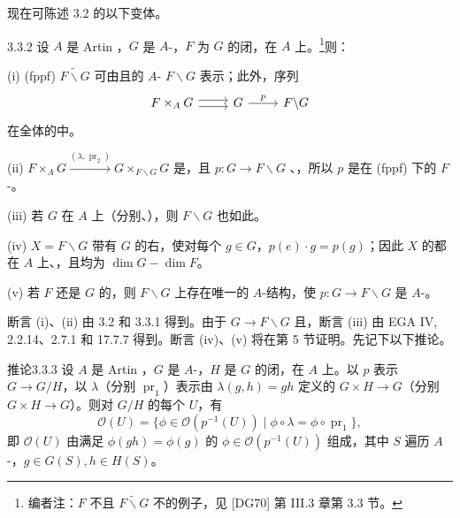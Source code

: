 现在可陈述 3.2 的以下变体。
\begin{SGAresult}{}{3.3.2}
设 $A$ 是 Artin ，$G$ 是 $A$-，$F$ 为 $G$ 的闭，在 $A$ 上。\footnote{编者注：$F$ 不且 $\widetilde{F\backslash G}$ 不的例子，见 [DG70] 第 III.3 章第 3.3 节。}则：

(i) (fppf)  $\widetilde{F\backslash G}$ 可由且的 $A$- $F\backslash G$ 表示；此外，序列
\[
\begin{tikzcd}
F\times_A G\arrow[r,shift left=.6ex]\arrow[r,shift right=.6ex]&G\arrow[r,"p"]&F\backslash G
\end{tikzcd}
\]
在全体的中。

(ii) $F\times_A G\xrightarrow{(\lambda,\operatorname{pr}_2)}G\times_{F\backslash G}G$ 是，且 $p:G\to F\backslash G$ 、，所以 $p$ 是在 (fppf) 下的 $F$-。

(iii) 若 $G$ 在 $A$ 上（分别、），则 $F\backslash G$ 也如此。

(iv) $X=F\backslash G$ 带有 $G$ 的右，使对每个 $g\in G$，$p(e)\cdot g=p(g)$；因此 $X$ 的都在 $A$ 上、，且均为 $\dim G-\dim F$。

(v) 若 $F$ 还是 $G$ 的，则 $F\backslash G$ 上存在唯一的 $A$-结构，使 $p:G\to F\backslash G$ 是 $A$-。
\end{SGAresult}
断言 (i)、(ii) 由 3.2 和 3.3.1 得到。由于 $G\to F\backslash G$ 且，断言 (iii) 由 EGA IV, 2.2.14、2.7.1 和 17.7.7 得到。断言 (iv)、(v) 将在第 5 节证明。先记下以下推论。
\begin{SGAresult}{推论}{3.3.3}
设 $A$ 是 Artin ，$G$ 是 $A$-，$H$ 是 $G$ 的闭，在 $A$ 上。以 $p$ 表示 $G\to G/H$，以 $\lambda$（分别 $\operatorname{pr}_1$）表示由 $\lambda(g,h)=gh$ 定义的 $G\times H\to G$（分别 $G\times H\to G$）。则对 $G/H$ 的每个 $U$，有
\[
\mathcal O(U)=\{\phi\in\mathcal O(p^{-1}(U))\mid\phi\circ\lambda=\phi\circ\operatorname{pr}_1\},
\]
即 $\mathcal O(U)$ 由满足 $\phi(gh)=\phi(g)$ 的 $\phi\in\mathcal O(p^{-1}(U))$ 组成，其中 $S$ 遍历 $A$-，$g\in G(S),h\in H(S)$。
\end{SGAresult}
